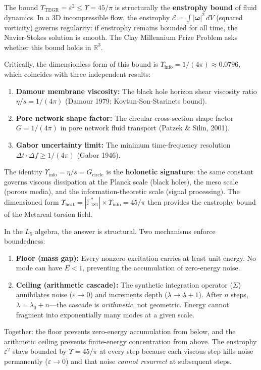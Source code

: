 \begin{remark}
The bound $T_{\text{TEGR}} = \varepsilon^2 \leq \Upsilon = 45/\pi$ is structurally the \textbf{enstrophy bound} of fluid dynamics. In a 3D incompressible flow, the enstrophy $\mathcal{E} = \int |\boldsymbol{\omega}|^2 \, dV$ (squared vorticity) governs regularity: if enstrophy remains bounded for all time, the Navier-Stokes solution is smooth. The Clay Millennium Prize Problem asks whether this bound holds in $\mathbb{R}^3$.

Critically, the dimensionless form of this bound is $\Upsilon_{\mathrm{info}} = 1/(4\pi) \approx 0.0796$, which coincides with three independent results:
\begin{enumerate}[noitemsep]
  \item \textbf{Damour membrane viscosity:} The black hole horizon shear viscosity ratio $\eta/s = 1/(4\pi)$ (Damour 1979; Kovtun-Son-Starinets bound).
  \item \textbf{Pore network shape factor:} The circular cross-section shape factor $G = 1/(4\pi)$ in pore network fluid transport (Patzek \& Silin, 2001).
  \item \textbf{Gabor uncertainty limit:} The minimum time-frequency resolution $\Delta t \cdot \Delta f \geq 1/(4\pi)$ (Gabor 1946).
\end{enumerate}
The identity $\Upsilon_{\mathrm{info}} = \eta/s = G_{\mathrm{circle}}$ is the \textbf{holonetic signature}: the same constant governs viscous dissipation at the Planck scale (black holes), the meso scale (porous media), and the information-theoretic scale (signal processing). The dimensioned form $\Upsilon_{\mathrm{heat}} = |\mathbb{F}_{181}^*| \times \Upsilon_{\mathrm{info}} = 45/\pi$ then provides the enstrophy bound of the Metareal torsion field.

In the $L_5$ algebra, the answer is structural. Two mechanisms enforce boundedness:
\begin{enumerate}[noitemsep]
    \item \textbf{Floor (mass gap):} Every nonzero excitation carries at least unit energy. No mode can have $E < 1$, preventing the accumulation of zero-energy noise.
    \item \textbf{Ceiling (arithmetic cascade):} The synthetic integration operator ($\Sigma$) annihilates noise ($\varepsilon \to 0$) and increments depth ($\lambda \to \lambda + 1$). After $n$ steps, $\lambda = \lambda_0 + n$---the cascade is \emph{arithmetic}, not geometric. Energy cannot fragment into exponentially many modes at a given scale.
\end{enumerate}
Together: the floor prevents zero-energy accumulation from below, and the arithmetic ceiling prevents finite-energy concentration from above. The enstrophy $\varepsilon^2$ stays bounded by $\Upsilon = 45/\pi$ at every step because each viscous step kills noise permanently ($\varepsilon \to 0$) and that noise \emph{cannot resurrect} at subsequent steps.


\end{remark}
